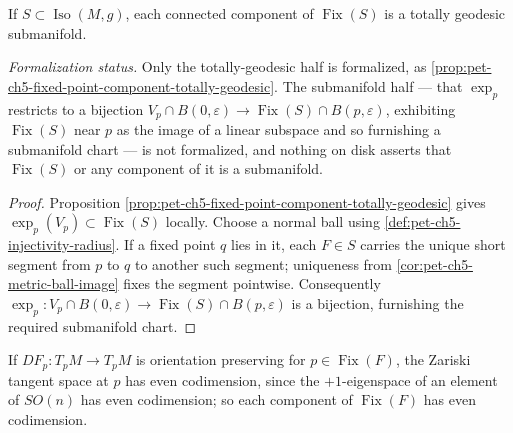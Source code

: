 \begin{proposition}
  \label{prop:pet-ch5-fixed-point-totally-geodesic}
  If $S\subset\operatorname{Iso}(M,g)$, each connected component of
  $\operatorname{Fix}(S)$ is a totally geodesic submanifold.

  \emph{Formalization status.} Only the totally-geodesic half is formalized, as
  \cref{prop:pet-ch5-fixed-point-component-totally-geodesic}. The submanifold half
  — that $\exp_p$ restricts to a bijection $V_p\cap B(0,\varepsilon)\to
  \operatorname{Fix}(S)\cap B(p,\varepsilon)$, exhibiting $\operatorname{Fix}(S)$
  near $p$ as the image of a linear subspace and so furnishing a submanifold chart
  — is not formalized, and nothing on disk asserts that
  $\operatorname{Fix}(S)$ or any component of it is a submanifold.
\end{proposition}
\begin{proof}
  \sketch
  Proposition \cref{prop:pet-ch5-fixed-point-component-totally-geodesic} gives
  $\exp_p(V_p)\subset\operatorname{Fix}(S)$ locally.  Choose a normal ball using
  \cref{def:pet-ch5-injectivity-radius}.  If a fixed point $q$ lies in it, each
  $F\in S$ carries the unique short segment from $p$ to $q$ to another such segment;
  uniqueness from \cref{cor:pet-ch5-metric-ball-image} fixes the segment pointwise.
  Consequently
  $\exp_p:V_p\cap B(0,\varepsilon)\to\operatorname{Fix}(S)\cap B(p,\varepsilon)$
  is a bijection, furnishing the required submanifold chart.
\end{proof}

\begin{remark}
  \label{rem:pet-ch5-fixed-point-codimension}

  If $DF_p:T_pM\to T_pM$ is orientation preserving for $p\in\operatorname{Fix}(F)$,
  the Zariski tangent space at $p$ has even codimension, since the $+1$-eigenspace
  of an element of $SO(n)$ has even codimension; so each component of
  $\operatorname{Fix}(F)$ has even codimension.
\end{remark}

